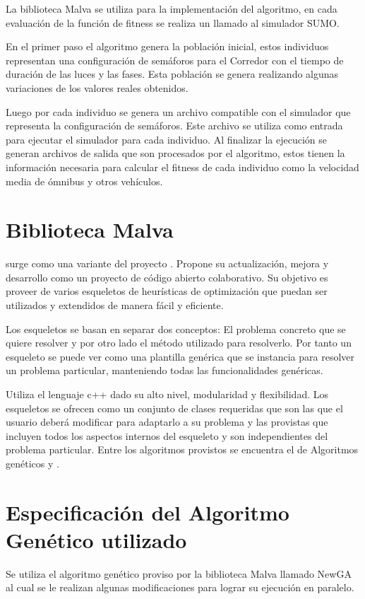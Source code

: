 La biblioteca Malva se utiliza para la implementación del algoritmo, en cada evaluación de la función de fitness se realiza un llamado al simulador SUMO. 

En el primer paso el algoritmo genera la población inicial, estos individuos representan una configuración de semáforos para el Corredor con el tiempo de duración de las luces y las fases. Esta población se genera realizando algunas variaciones de los valores reales obtenidos.

Luego por cada individuo se genera un archivo compatible con el simulador que representa la configuración de semáforos. Este archivo se utiliza como entrada para ejecutar el simulador para cada individuo. Al finalizar la ejecución se generan archivos de salida que son procesados por el algoritmo, estos tienen la información necesaria para calcular el fitness de cada individuo como la velocidad media de ómnibus y otros vehículos.


\section{Biblioteca Malva}

\citep{Malva} surge como una variante del proyecto \citep{Mallba}. Propone su actualización, mejora y desarrollo como un proyecto de código abierto colaborativo.  Su objetivo es proveer de varios esqueletos de  heurísticas de optimización que puedan ser utilizados y extendidos de manera fácil y eficiente.

Los esqueletos se basan en separar dos conceptos: El problema concreto que se quiere resolver y por otro lado el método utilizado para resolverlo. Por tanto un esqueleto se puede ver como una plantilla genérica que se instancia para resolver un problema particular, manteniendo todas las funcionalidades genéricas.

Utiliza el lenguaje c++ dado su alto nivel, modularidad y flexibilidad. Los esqueletos se ofrecen como un conjunto de clases requeridas que son las que el usuario deberá modificar para adaptarlo a su problema y las provistas que incluyen todos los aspectos internos del esqueleto y son independientes del problema particular. Entre los algoritmos provistos se encuentra el de Algoritmos genéticos y \citep{CHC}.



\newpage

\section{Especificación del Algoritmo Genético utilizado}
Se utiliza el algoritmo genético proviso por la biblioteca  Malva  llamado NewGA al cual se le realizan algunas modificaciones para lograr su ejecución en paralelo.


